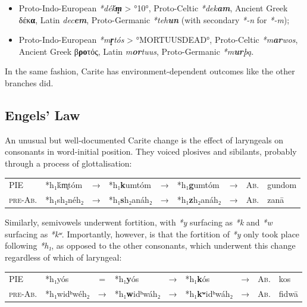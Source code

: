 \documentclass[svgnames,x11names,b5paper]{book}
\begin{document}
\begin{itemize}
\item  Proto-Indo-European \textit{*déḱ\textbf{m̥}} > °10°, Proto-Celtic \textit{*dek\textbf{am}}, Ancient Greek δέκ\textbf{α}, Latin \textit{dec\textbf{em}}, Proto-Germanic \textit{*teh\textbf{un}} (with secondary \textit{*-n} for \textit{*-m});\\
\item  Proto-Indo-European \textit{*m\textbf{r̥}tós} > °MORTUUSDEAD°, Proto-Celtic \textit{*m\textbf{ar}wos}, Ancient Greek β\textbf{ρο}τός, Latin \textit{m\textbf{or}tuus}, Proto-Germanic \textit{*m\textbf{ur}þą}.\\
\end{itemize}
In the same fashion, Carite has environment-dependent outcomes like the other branches did.

            \subsection{Engels' Law}
        
        An unusual but well-documented Carite change is the effect of laryngeals on consonants in word-initial position. They voiced plosives and sibilants, probably through a process of glottalisation:

            \begin{table}[H]
                \begin{center}
                \begin{tabular}{llcllllll}
                \textsc{PIE} & *h₁ḱm̥tóm & → & *h₁\textbf{k}umtóm & → & *h₁\textbf{g}umtóm & → & \textsc{Ab.} & gundom\\
                \textsc{pre-Ab.} & *h₁sh₂néh₂ & → & *h₁\textbf{s}h₂anáh₂ & → & *h₁\textbf{z}h₂anáh₂ & → & \textsc{Ab.} & zanā\\
                \end{tabular}
                \end{center}
                \end{table}
        
        Similarly, semivowels underwent fortition, with \textit{*y} surfacing as \textit{*k} and \textit{*w} surfacing as \textit{*kʷ}. Importantly, however, is that the fortition of \textit{*y} only took place following \textit{*h₁}, as opposed to the other consonants, which underwent this change regardless of which of laryngeal:

            \begin{table}[H]
                \begin{center}
                \begin{tabular}{llcllllll}
                \textsc{PIE} & *h₁yós & = & *h₁\textbf{y}ós & → & *h₁\textbf{k}ós & → & \textsc{Ab.} & kos\\
                \textsc{pre-Ab.} & *h₁widʰwéh₂ & → & *h₁\textbf{w}idʰwáh₂ & → & *h₁\textbf{kʷ}idʰwáh₂ & → & \textsc{Ab.} & fidwā\\
                \end{tabular}
                \end{center}
                \end{table}
        
\end{document}
